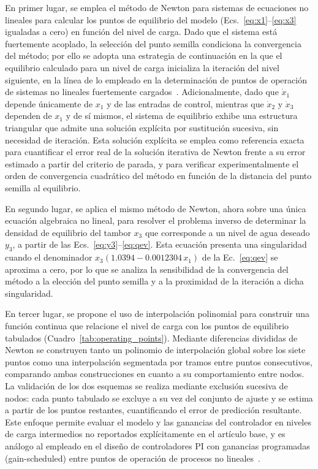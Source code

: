 \documentclass[final,5p,times,twocolumn,authoryear,11pt]{elsarticle}
\begin{document}
En primer lugar, se emplea el método de Newton para sistemas de ecuaciones no lineales para calcular los puntos de equilibrio del modelo (Ecs.~\eqref{eq:x1}--\eqref{eq:x3} igualadas a cero) en función del nivel de carga. Dado que el sistema está fuertemente acoplado, la selección del punto semilla condiciona la convergencia del método; por ello se adopta una estrategia de continuación en la que el equilibrio calculado para un nivel de carga inicializa la iteración del nivel siguiente, en la línea de lo empleado en la determinación de puntos de operación de sistemas no lineales fuertemente cargados~\citep{ajjarapu1992continuation}. Adicionalmente, dado que $\dot{x}_1$ depende únicamente de $x_1$ y de las entradas de control, mientras que $\dot{x}_2$ y $\dot{x}_3$ dependen de $x_1$ y de sí mismos, el sistema de equilibrio exhibe una estructura triangular que admite una solución explícita por sustitución sucesiva, sin necesidad de iteración. Esta solución explícita se emplea como referencia exacta para cuantificar el error real de la solución iterativa de Newton frente a su error estimado a partir del criterio de parada, y para verificar experimentalmente el orden de convergencia cuadrático del método en función de la distancia del punto semilla al equilibrio.

En segundo lugar, se aplica el mismo método de Newton, ahora sobre una única ecuación algebraica no lineal, para resolver el problema inverso de determinar la densidad de equilibrio del tambor $x_3$ que corresponde a un nivel de agua deseado $y_3$, a partir de las Ecs.~\eqref{eq:y3}--\eqref{eq:qev}. Esta ecuación presenta una singularidad cuando el denominador $x_3(1.0394 - 0.0012304\,x_1)$ de la Ec.~\eqref{eq:qev} se aproxima a cero, por lo que se analiza la sensibilidad de la convergencia del método a la elección del punto semilla y a la proximidad de la iteración a dicha singularidad.

En tercer lugar, se propone el uso de interpolación polinomial para construir una función continua que relacione el nivel de carga con los puntos de equilibrio tabulados (Cuadro~\ref{tab:operating_points}). Mediante diferencias divididas de Newton se construyen tanto un polinomio de interpolación global sobre los siete puntos como una interpolación segmentada por tramos entre puntos consecutivos, comparando ambas construcciones en cuanto a su comportamiento entre nodos. La validación de los dos esquemas se realiza mediante exclusión sucesiva de nodos: cada punto tabulado se excluye a su vez del conjunto de ajuste y se estima a partir de los puntos restantes, cuantificando el error de predicción resultante. Este enfoque permite evaluar el modelo y las ganancias del controlador en niveles de carga intermedios no reportados explícitamente en el artículo base, y es análogo al empleado en el diseño de controladores PI con ganancias programadas (gain-scheduled) entre puntos de operación de procesos no lineales~\citep{gao2005design}.
\end{document}
